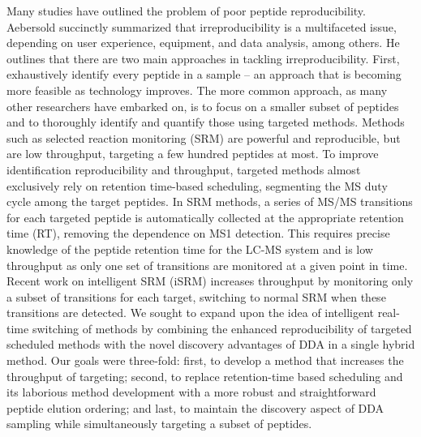 Many studies have outlined the problem of poor peptide reproducibility.\cite{liu,mrm,tabb,bigtime,pachl} Aebersold succinctly summarized that irreproducibility is a multifaceted issue, depending on user experience, equipment, and data analysis, among others.\cite{aebersold} He outlines that there are two main approaches in tackling irreproducibility. First, exhaustively identify every peptide in a sample -- an approach that is becoming more feasible as technology improves.\cite{thakur,nagaraj,onehour} The more common approach, as many other researchers have embarked on, is to focus on a smaller subset of peptides and to thoroughly identify and quantify those using targeted methods.\cite{savitski} Methods such as selected reaction monitoring (SRM) are powerful and reproducible, but are low throughput, targeting a few hundred peptides at most.\cite{lange,picotti1,picotti2} To improve identification reproducibility and throughput, targeted methods almost exclusively rely on retention time-based scheduling, segmenting the MS duty cycle among the target peptides. In SRM methods, a series of MS/MS transitions for each targeted peptide is automatically collected at the appropriate retention time (RT), removing the dependence on MS1 detection. This requires precise knowledge of the peptide retention time for the LC-MS system and is low throughput as only one set of transitions are monitored at a given point in time. Recent work on intelligent SRM (iSRM) increases throughput by monitoring only a subset of transitions for each target, switching to normal SRM when these transitions are detected.\cite{isrm} We sought to expand upon the idea of intelligent real-time switching of methods by combining the enhanced reproducibility of targeted scheduled methods with the novel discovery advantages of DDA in a single hybrid method. Our goals were three-fold: first, to develop a method that increases the throughput of targeting; second, to replace retention-time based scheduling and its laborious method development with a more robust and straightforward peptide elution ordering; and last, to maintain the discovery aspect of DDA sampling while simultaneously targeting a subset of peptides.

